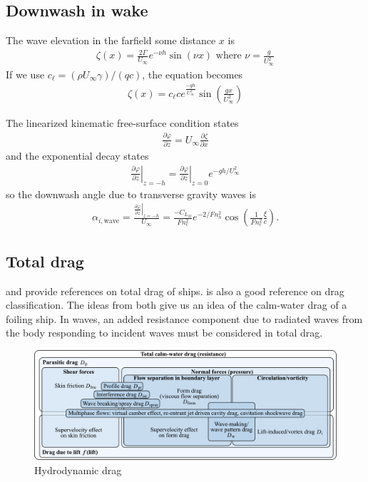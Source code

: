 \documentclass[10pt]{article}
\newcommand{\pp}[2]{\frac{\partial #1}{\partial #2}}
\newcommand{\be}{\begin{eqnarray}}
\newcommand{\ee}{\end{eqnarray}}
\newcommand{\Uinf}{U_{\infty}}
\newcommand{\tn}[1]{\textrm{#1}}
\begin{document}
\subsection{Downwash in wake}
The wave elevation in the farfield some distance $x$ is
\be
\zeta(x) = \frac{2\Gamma}{\Uinf}e^{-\nu h} \sin(\nu x)
\tn{ where }
\nu = \frac{g}{\Uinf^2}
\ee
If we use $c_\ell = (\rho \Uinf \gamma) /\left(q c\right)$, the equation becomes
\be
\zeta(x) = c_\ell c e^{\frac{-gh}{\Uinf^2}} \sin\left(\frac{g x}{\Uinf^2}\right)
\ee

The linearized kinematic free-surface condition states
\be
\label{eqn:KFSBC}
\pp{\varphi}{z} =
\Uinf \pp{\zeta}{x}
\ee
and the exponential decay states
\be
\left. \pp{\varphi}{z} \right|_{z=-h} =
\left. \pp{\varphi}{z} \right|_{z=0} e^{-gh/\Uinf^2}
\ee
so the downwash angle due to transverse gravity waves is
\be
\alpha_{i,\tn{wave}} = \frac{ \left. \pp{\varphi}{z} \right|_{z=-h} }{\Uinf}
=
\frac{
-C_{L_M}
}{Fn_c^2} e^{{-2}/{Fn_h^2}}
\cos\left(
\frac{1}{Fn_c^2}\frac{\xi}{c}
\right).
\ee

\subsection{Total drag}

\citet[Fig. 21.3]{carlton2007} and \citet[Fig. 4]{Chernyshev2023} provide references on total drag of ships.
\citet[Fig. 12.2]{Raymer2012} is also a good reference on drag classification.
The ideas from both give us an idea of the calm-water drag of a foiling ship.
In waves, an added resistance component due to radiated waves from the body responding to incident waves must be considered in total drag.
\begin{figure}[htb!]
	\centering
	\includegraphics[width=\linewidth,clip,trim={0cm 0cm 0cm 0cm}]{modernDragBuildUp_v2.pdf}
	\caption{\label{fig:HydroDrag}Hydrodynamic drag}
\end{figure}
\clearpage
\end{document}
